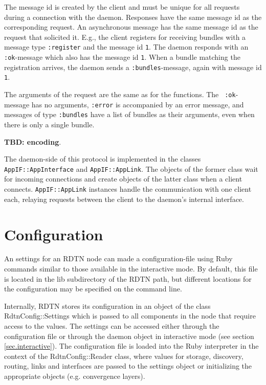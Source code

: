 \documentclass{article}
\begin{document}
The message id is created by the client and must be unique for all requests
during a connection with the daemon. Responses have the same message id as the
corresponding request. An asynchronous message has the same message id as the
request that solicited it. E.g., the client registers for receiving bundles with
a message type {\tt :register} and the message id {\tt 1}. The daemon responds
with an {\tt :ok}-message which also has the message id {\tt 1}. When a bundle
matching the registration arrives, the daemon sends a {\tt :bundles}-message,
again with message id {\tt 1}.

The arguments of the request are the same as for the functions. The {\tt
:ok}-message has no arguments, {\tt :error} is accompanied by an error message,
and messages of type {\tt :bundles} have a list of bundles as their arguments,
even when there is only a single bundle.

{\bf TBD: encoding}.

The daemon-side of this protocol is implemented in the classes {\tt
AppIF::AppInterface} and {\tt AppIF::AppLink}. The objects of the former class
wait for incoming connections and create objects of the latter class when a
client connects. {\tt AppIF::AppLink} instances handle the communication with
one client each, relaying requests between the client to the daemon's internal
interface.

\section{Configuration}\label{sec.config}

An settings for an RDTN node can made a configuration-file using Ruby commands
similar to those available in the interactive mode. By default, this file is
located in the lib subdirectory of the RDTN path, but different locations for
the configuration may be specified on the command line.

Internally, RDTN stores its configuration in an object of the class
RdtnConfig::Settings which is passed to all components in the node that require
access to the values. The settings can be accessed either through the
configuration file or through the daemon object in interactive mode (see section
\ref{sec.interactive}). The configuration file is loaded into the Ruby
interpreter in the context of the RdtnConfig::Reader class, where values for
storage, discovery, routing, links and interfaces are passed to the settings
object or initializing the appropriate objects (e.g. convergence layers).
\end{document}
